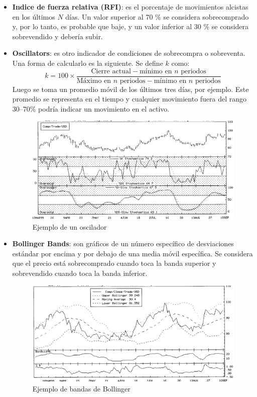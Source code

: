 \begin{itemize}
    \item \textbf{Indice de fuerza relativa (RFI)}: es el porcentaje de movimientos alcistas en los últimos $N$ días. Un valor superior al 70 \% se considera sobrecomprado y, por lo tanto, es probable que baje, y un valor inferior al 30 \% se considera sobrevendido y debería subir.
    \item \textbf{Oscillators}: es otro indicador de condiciones de sobrecompra o sobreventa. Una forma de calcularlo es la siguiente. Se define $k$ como:
    \[
        k = 100 \times \frac{\text{Cierre actual} - \text{mínimo en } n \text{ periodos}}{\text{Máximo en } n \text{ periodos} - \text{mínimo en } n \text{ periodos}}
    \]
    Luego se toma un promedio móvil de los últimos tres días, por ejemplo. Este promedio se representa en el tiempo y cualquier movimiento fuera del rango 30--70\% podría indicar un movimiento en el activo.
        \begin{figure}[H]
            \centering
            \includegraphics[width=0.65\linewidth]{Imagenes/Parte1/16_Prediccion/Oscillator.png}
            \caption{Ejemplo de un oscilador}
        \end{figure}
    \item \textbf{Bollinger Bands}: son gráficos de un número específico de desviaciones estándar por encima y por debajo de una media móvil específica. Se considera que el precio está sobrecomprado cuando toca la banda superior y sobrevendido cuando toca la banda inferior.
        \begin{figure}[H]
            \centering
            \includegraphics[width=0.65\linewidth]{Imagenes/Parte1/16_Prediccion/Bollinger Bands.png}
            \caption{Ejemplo de bandas de Bollinger}

\end{figure}
\end{itemize}

